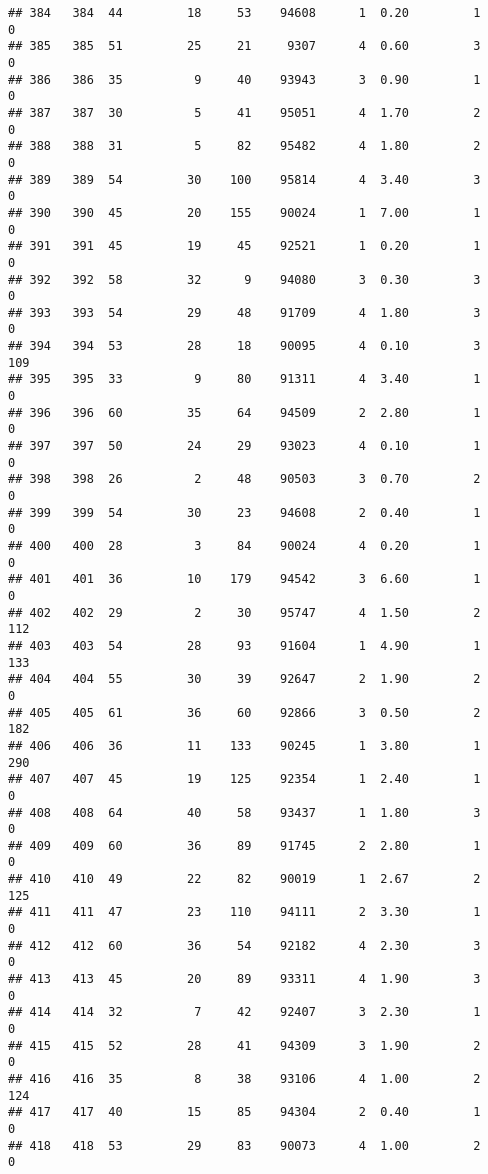 \documentclass[
]{article}
\begin{document}
\begin{verbatim}
## 384   384  44         18     53    94608      1  0.20         1        0
## 385   385  51         25     21     9307      4  0.60         3        0
## 386   386  35          9     40    93943      3  0.90         1        0
## 387   387  30          5     41    95051      4  1.70         2        0
## 388   388  31          5     82    95482      4  1.80         2        0
## 389   389  54         30    100    95814      4  3.40         3        0
## 390   390  45         20    155    90024      1  7.00         1        0
## 391   391  45         19     45    92521      1  0.20         1        0
## 392   392  58         32      9    94080      3  0.30         3        0
## 393   393  54         29     48    91709      4  1.80         3        0
## 394   394  53         28     18    90095      4  0.10         3      109
## 395   395  33          9     80    91311      4  3.40         1        0
## 396   396  60         35     64    94509      2  2.80         1        0
## 397   397  50         24     29    93023      4  0.10         1        0
## 398   398  26          2     48    90503      3  0.70         2        0
## 399   399  54         30     23    94608      2  0.40         1        0
## 400   400  28          3     84    90024      4  0.20         1        0
## 401   401  36         10    179    94542      3  6.60         1        0
## 402   402  29          2     30    95747      4  1.50         2      112
## 403   403  54         28     93    91604      1  4.90         1      133
## 404   404  55         30     39    92647      2  1.90         2        0
## 405   405  61         36     60    92866      3  0.50         2      182
## 406   406  36         11    133    90245      1  3.80         1      290
## 407   407  45         19    125    92354      1  2.40         1        0
## 408   408  64         40     58    93437      1  1.80         3        0
## 409   409  60         36     89    91745      2  2.80         1        0
## 410   410  49         22     82    90019      1  2.67         2      125
## 411   411  47         23    110    94111      2  3.30         1        0
## 412   412  60         36     54    92182      4  2.30         3        0
## 413   413  45         20     89    93311      4  1.90         3        0
## 414   414  32          7     42    92407      3  2.30         1        0
## 415   415  52         28     41    94309      3  1.90         2        0
## 416   416  35          8     38    93106      4  1.00         2      124
## 417   417  40         15     85    94304      2  0.40         1        0
## 418   418  53         29     83    90073      4  1.00         2        0

\end{verbatim}
\end{document}
